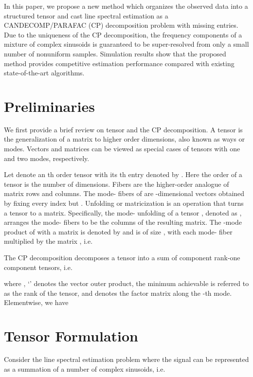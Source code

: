 \documentclass[10pt,journal,epsfig]{IEEEtran}
\begin{document}
In this paper, we propose a new method which organizes the
observed data into a structured tensor and cast line spectral
estimation as a CANDECOMP/PARAFAC (CP) decomposition problem with
missing entries. Due to the uniqueness of the CP decomposition,
the frequency components of a mixture of complex sinusoids is
guaranteed to be super-resolved from only a small number of
nonuniform samples. Simulation results show that the proposed
method provides competitive estimation performance compared with
existing state-of-the-art algorithms.




\section{Preliminaries}
We first provide a brief review on tensor and the CP
decomposition. A tensor is the generalization of a matrix to
higher order dimensions, also known as ways or modes. Vectors and
matrices can be viewed as special cases of tensors with one and
two modes, respectively.

Let  denote an th order tensor with its
th entry denoted by . Here the order  of a tensor is the number of dimensions.
Fibers are the higher-order analogue of matrix rows and columns.
The mode- fibers of  are
-dimensional vectors obtained by fixing every index but
. Unfolding or matricization is an operation that turns a
tensor to a matrix. Specifically, the mode- unfolding of a
tensor , denoted as
, arranges the mode- fibers to be the
columns of the resulting matrix. The -mode product of
 with a matrix
 is denoted by
 and is of size
, with each mode- fiber multiplied by the matrix
, i.e.



The CP decomposition decomposes a tensor into a sum of component
rank-one component tensors, i.e.

where , `'
denotes the vector outer product, the minimum achievable  is
referred to as the rank of the tensor, and
 denotes the factor matrix along the -th mode.
Elementwise, we have






\section{Tensor Formulation}
Consider the line spectral estimation problem where the signal
 can be represented as a summation of a number of complex
sinusoids, i.e.
\end{document}
